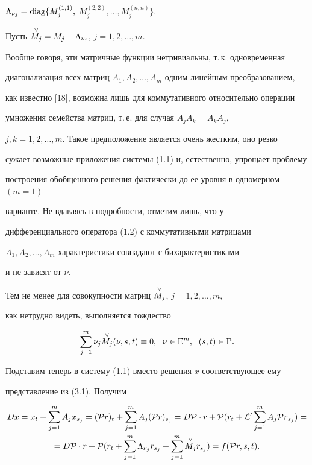 $\Lambda_{\nu_j}=\operatorname{diag} \{ M^{(1,1)}_j,$ $M^{(2,2)}_j,\dotsc, M^{(n,n)}_j\}$.




Пусть $\overset{\vee}{M_j}{}=M_j - \Lambda_{\nu_j}$, $j=1,2,\dotsc,m$.


Вообще говоря, эти матричные функции нетривиальны, т.\,к. одновременная 


диагонализация всех матриц $A_1,A_2,\dotsc,A_m$ одним линейным преобразованием,


как известно [18], возможна лишь для коммутативного относительно операции 


умножения семейства матриц, т.\,е. для случая $A_j A_k=A_k A_j$, 


$j,k=1,2,\dotsc,m$. Такое предположение является очень жестким, оно резко 


сужает возможные приложения системы (1.1) и, естественно, упрощает проблему 


построения обобщенного решения фактически до ее уровня в одномерном $(m=1)$ 


варианте. Не вдаваясь в подробности, отметим лишь, что у 


дифференциального оператора (1.2) с коммутативными матрицами 


$A_1,A_2,\dotsc,A_m$ характеристики совпадают с бихарактеристиками


и не зависят от $\nu$.


Тем не менее для совокупности матриц $\overset{\vee}{M_j}{}$, $j=1,2,\dotsc,m$,


как нетрудно видеть, выполняется тождество


\begin{equation}


\sum_{j=1}^m \nu_j \up{\vee}{M_j}(\nu,s,t) \equiv 0, 


\ \; \nu \in {\mathrm E}^m,\ \; (s,t) \in {\mathrm P}.


\end{equation}





Подставим теперь в систему (1.1) вместо решения $x$ соответствующее ему


представление из (3.1). Получим


\begin{multline*}


Dx=x_t+\sum_{j=1}^m A_j x_{s_j}=({\cal P} r)_t+


\sum_{j=1}^m A_j ({\cal P} r)_{s_j}=


D{\cal P} \cdot r+{\cal P} (r_t+{\cal L}^{\prime}


\sum_{j=1}^m A_j {{\cal P} r}_{s_j})= \\


%


=D{\cal P} \cdot r+{\cal P} (r_t+\sum_{j=1}^m \Lambda_{\nu_j} r_{s_j}+


\sum_{j=1}^m \up{\vee}{M_j} r_{s_j})=f({\cal P}r,s,t).


\end{multline*}


